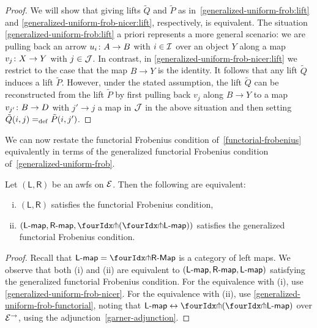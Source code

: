 \documentclass[reqno,10pt,a4paper,oneside,draft]{amsart}
\newcommand{\LL}{\mathsf{L}}
\newcommand{\RR}{\mathsf{R}}
\begin{document}
{{\begin{proof}
We will show that giving lifts $\tilde{Q}$ and $\tilde{P}$ as in~\eqref{generalized-uniform-frob:lift} and \eqref{generalized-uniform-frob-nicer:lift}, respectively, is equivalent.
The situation \eqref{generalized-uniform-frob:lift} a priori represents a more general scenario: we are pulling back an arrow $u_i \co A \to B$ with $i \in \cal{I}$ over an object $Y$ along a map $v_j \co X \to Y$ with $j \in \cal{J}$.
In contrast, in \eqref{generalized-uniform-frob-nicer:lift} we restrict to the case that the map $B \to Y$ is the identity.
It follows that any lift $\tilde{Q}$ induces a lift $\tilde{P}$.
However, under the stated assumption, the lift $\tilde{Q}$ can be reconstructed from the lift $\tilde{P}$ by first pulling back $v_j$ along $B \to Y$ to a map $v_{j'} \co B \to D$ with $j' \to j$ a map in $\cal{J}$ in the above situation and then setting $\tilde{Q}(i, j) \defeq \tilde{P}(i, j')$.
\end{proof}

We can now restate the functorial Frobenius condition of~\cref{functorial-frobenius} equivalently in terms of the generalized functorial Frobenius condition of~\cref{generalized-uniform-frob}.

\begin{proposition}
Let $(\mathsf{L}, \mathsf{R})$ be an awfs on $\cal{E}$.
Then the following are equivalent:
\begin{enumerate}[(i)]
\item $(\LL, \RR)$ satisfies the functorial Frobenius condition,
\item $(\pcoalg{\LL}, \palg{\RR}, \liftl{(\liftr{\pcoalg{\LL}})})$ satisfies the generalized functorial Frobenius condition.
\end{enumerate}
\end{proposition}

\begin{proof}
Recall that $\pcoalg{\LL} = \liftl{\pAlg{\RR}}$ is a category of left maps.
We observe that both (i) and (ii) are equivalent to $(\pcoalg{\LL}, \palg{\RR}, \pcoalg{\LL})$ satisfying the generalized functorial Frobenius condition.
For the equivalence with (i), use \cref{generalized-uniform-frob-nicer}.
For the equivalence with (ii), use \cref{generalized-uniform-frob-functorial}, noting that
$\pcoalg{\LL} \leftrightarrow \liftl{(\liftr{\pcoalg{\LL}})}$ over $\cal{E}^\to$, using the adjunction~\eqref{garner-adjunction}.
\end{proof}

}}
\end{document}
